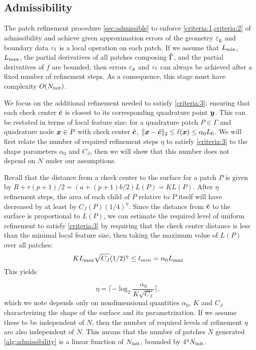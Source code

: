 \subsection{Admissibility \label{sec:complexity_admissibility}}

The patch refinement procedure \cref{sec:admissible} to enforce \cref{criteria:1,criteria:2} of admissibility and achieve given approximation errors of the geometry ${\varepsilon_{\mathrm{g}}}$ and boundary data ${\varepsilon_{\mathrm{f}}}$ is a local operation on each patch.
If we assume that $L_{\mathrm{min}}$, $L_{\mathrm{max}}$, the partial derivatives of all patches composing $\hat{\Gamma}$, and the partial derivatives of $f$ are bounded, then 
 errors ${\varepsilon_{\mathrm{g}}}$ and ${\varepsilon_{\mathrm{f}}}$ can always be achieved after a fixed number of refinement steps. As a consequence, this stage must have complexity $O(N_{\mathrm{init}})$. 


We focus on the additional refinement needed to satisfy \cref{criteria:3}: ensuring that each check center ${\hat{\bm{c}}}$ is closest to its corresponding quadrature point ${\bm{y}}$. 
This can be restated in terms of local feature size: for a quadrature patch $P \in \Gamma$ and quadrature node ${\bm{x}} \in P$ with check center ${\hat{\bm{c}}}$, $\|{\bm{x}} - {\hat{\bm{c}}}\|_2 \leq \ell({\bm{x}}) \leq \alpha_0 L_0$. 
We will first relate the number of required refinement steps $\eta$ to satisfy \cref{criteria:3} to the shape parameters $\alpha_0$ and $C_J$, then we will show that this number does not depend on $N$ under our assumptions.

Recall that the distance from a check center to the surface  for a patch $P$ is given by
$R + r(p+1)/2 = (a+ (p+1)b/2)L(P)= K L(P)$. %
After $\eta$ refinement steps, the area of each child of $P$ relative to $P$ itself will have decreased by at least by $C_J(P)(1/4)^\eta$.  
Since the distance from ${\hat{\bm{c}}}$ to the surface is proportional to $L(P)$, we can estimate the required level
of uniform refinement to satisfy \cref{criteria:3} by requiring that the check center distance is less than the minimal local feature size, then taking the maximum value of $L(P)$ over all patches:
\[
K L_{\mathrm{max}} \sqrt{C_J} (1/2)^\eta \leq \ell_{min} = \alpha_0 L_{\mathrm{max}}
\]
This yields

\begin{equation}
  \eta   =  \lceil -\log_2 \frac{\alpha_0}{K \sqrt{C_J}}\rceil,
\label{eq:eta-estimate}
\end{equation}
which we note depends only on nondimensional quantities $\alpha_0$, $K$ and $C_J$ characterizing the shape of the surface and its parametrization.  
If we assume these to be independent of $N$, then
the number of required levels of refinement $\eta$ are also independent of $N$. 
This means that the number of patches $N$ generated \cref{alg:admissibility} is a linear function of $N_{\mathrm{init}}$, bounded by $4^{\eta} N_{\mathrm{init}}$.

